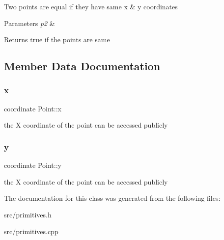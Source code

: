 Two points are equal if they have same x \& y coordinates 
\begin{DoxyParams}{Parameters}
{\em p2} & \\
\hline
\end{DoxyParams}
\begin{DoxyReturn}{Returns}
true if the points are same 
\end{DoxyReturn}


\subsection{Member Data Documentation}
\mbox{\label{classPoint_a2e5bf2da8d7f35ef2ca707ae5ec1929b}} 
\subsubsection{\texorpdfstring{x}{x}}
{\footnotesize\ttfamily coordinate Point\+::x}

the X coordinate of the point can be accessed publicly \mbox{\label{classPoint_a4390d37c7ed19ad07212fc84df2fe26e}} 
\subsubsection{\texorpdfstring{y}{y}}
{\footnotesize\ttfamily coordinate Point\+::y}

the X coordinate of the point can be accessed publicly 

The documentation for this class was generated from the following files\+:\begin{DoxyCompactItemize}
\item 
src/primitives.\+h\item 
src/primitives.\+cpp\end{DoxyCompactItemize}
